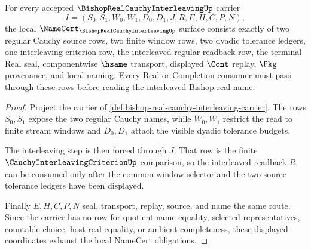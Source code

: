 \begin{theorem}
\label{thm:bishop-real-cauchy-interleaving-obligations}
For every accepted $\BishopRealCauchyInterleavingUp$ carrier
$$
I=(S_0,S_1,W_0,W_1,D_0,D_1,J,R,E,H,C,P,N),
$$
the local $\NameCert_{\BishopRealCauchyInterleavingUp}$ surface consists exactly of two regular Cauchy source rows, two finite window rows, two dyadic tolerance ledgers, one interleaving criterion row, the interleaved regular readback row, the terminal Real seal, componentwise $\hsame$ transport, displayed $\Cont$ replay, $\Pkg$ provenance, and local naming. Every Real or Completion consumer must pass through these rows before reading the interleaved Bishop real name.
\end{theorem}
\begin{proof}
Project the carrier of \autoref{def:bishop-real-cauchy-interleaving-carrier}. The rows $S_0,S_1$ expose the two regular Cauchy names, while $W_0,W_1$ restrict the read to finite stream windows and $D_0,D_1$ attach the visible dyadic tolerance budgets.

The interleaving step is then forced through $J$. That row is the finite $\CauchyInterleavingCriterionUp$ comparison, so the interleaved readback $R$ can be consumed only after the common-window selector and the two source tolerance ledgers have been displayed.

Finally $E,H,C,P,N$ seal, transport, replay, source, and name the same route. Since the carrier has no row for quotient-name equality, selected representatives, countable choice, host real equality, or ambient completeness, these displayed coordinates exhaust the local NameCert obligations.
\end{proof}


